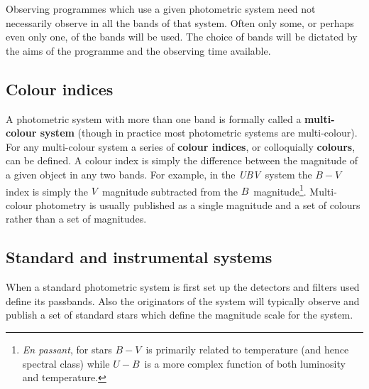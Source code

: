\documentclass[twoside,11pt]{article}
\begin{document}
Observing programmes which use a given photometric system need not
necessarily observe in all the bands of that system.  Often only some,
or perhaps even only one, of the bands will be used.  The choice of bands
will be dictated by the aims of the programme and the observing time
available.

\subsection{Colour indices}

A photometric system with more than one band is formally called a
{\bf multi-colour system} (though in practice most photometric systems
are multi-colour).  For any multi-colour system a series of {\bf
colour indices}, or colloquially {\bf colours}, can be defined.  A
colour index is simply the difference between the magnitude of a given
object in any two bands.  For example, in the {\it UBV}\, system the
$B - V$\, index is simply the $V$\, magnitude subtracted from the $B$\,
magnitude\footnote{{\it En passant}, for stars $B - V$\, is primarily
related to temperature (and hence spectral class) while $U - B$\, is a
more complex function of both luminosity and temperature.}.  Multi-colour
photometry is usually published as a single magnitude and a set of
colours rather than a set of magnitudes.

\subsection{Standard and instrumental systems}

When a standard photometric system is first set up the detectors and
filters used define its passbands.  Also the originators of the system
will typically observe and publish a set of standard stars which
define the magnitude scale for the system.
\end{document}
